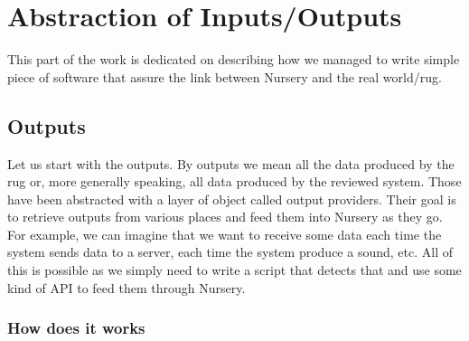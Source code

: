 \documentclass[12pt]{article}
\theoremstyle{definition}
\theoremstyle{definition}
\theoremstyle{remark}
\begin{document}
\clearpage
\section{Abstraction of Inputs/Outputs}

This part of the work is dedicated on describing how we managed to write simple piece of software that assure the link between Nursery and the real world/\gls{rug}.




\subsection{Outputs}

Let us start with the outputs. By outputs we mean all the data produced by the \gls{rug} or, more generally speaking, all data produced by the reviewed system. Those have been abstracted with a layer of object called output providers. Their goal is to retrieve outputs from various places and feed them into Nursery as they go.\\

For example, we can imagine that we want to receive some data each time the system sends data to a server, each time the system produce a sound, etc. All of this is possible as we simply need to write a script that detects that and use some kind of API to feed them through Nursery.\\

\subsubsection{How does it works}
\end{document}
